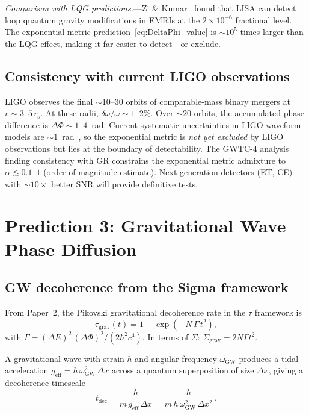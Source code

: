 \documentclass[prl,twocolumn,superscriptaddress,longbibliography]{revtex4-2}
\newcommand{\tauasym}{\tau}
\newcommand{\rs}{r_{\mathrm{s}}}
\newcommand{\Sgrav}{\Sigma_{\mathrm{grav}}}
\begin{document}
\emph{Comparison with LQG predictions.}---Zi \& Kumar~\cite{ZiKumar2024}
found that LISA can detect loop quantum gravity modifications
in EMRIs at the $2 \times 10^{-6}$ fractional level.  The
exponential metric prediction~\eqref{eq:DeltaPhi_value}
is $\sim 10^5$ times larger than the LQG effect, making it
far easier to detect---or exclude.

\subsection{Consistency with current LIGO observations}

LIGO observes the final $\sim$10--30 orbits of comparable-mass
binary mergers at $r \sim 3$--$5\,\rs$.  At these radii,
$\delta\omega/\omega \sim 1$--$2\%$.  Over $\sim 20$ orbits,
the accumulated phase difference is $\Delta\Phi \sim 1$--$4$~rad.
Current systematic uncertainties in LIGO waveform models are
$\sim 1$~rad~\cite{GWTC4_TGR2026}, so the exponential metric
is \emph{not yet excluded} by LIGO observations but lies at
the boundary of detectability.  The GWTC-4 analysis
finding consistency with GR constrains the exponential metric
admixture to $\alpha \lesssim 0.1$--$1$ (order-of-magnitude
estimate).  Next-generation detectors (ET, CE) with
$\sim 10\times$ better SNR will provide definitive tests.

\section{Prediction 3: Gravitational Wave Phase Diffusion}
\label{sec:decoherence}

\subsection{GW decoherence from the Sigma framework}

From Paper~2, the Pikovski gravitational decoherence rate
in the $\tauasym$ framework is
\begin{equation}
  \tauasym_{\mathrm{grav}}(t)
  = 1 - \exp\!\left(-N\,\Gamma\,t^2\right),
\end{equation}
with $\Gamma = (\Delta E)^2\,(\Delta\Phi)^2 / (2\hbar^2 c^4)$.
In terms of $\Sigma$:
$\Sgrav = 2N\Gamma t^2$.

A gravitational wave with strain $h$ and angular frequency
$\omega_{\mathrm{GW}}$ produces a tidal acceleration
$g_{\mathrm{eff}} = h\,\omega_{\mathrm{GW}}^2\,\Delta x$
across a quantum superposition of size $\Delta x$, giving
a decoherence timescale
\begin{equation}
  t_{\mathrm{dec}} = \frac{\hbar}{m\,g_{\mathrm{eff}}\,\Delta x}
  = \frac{\hbar}{m\,h\,\omega_{\mathrm{GW}}^2\,\Delta x^2}\,.
  \label{eq:t_dec}
\end{equation}
\end{document}
